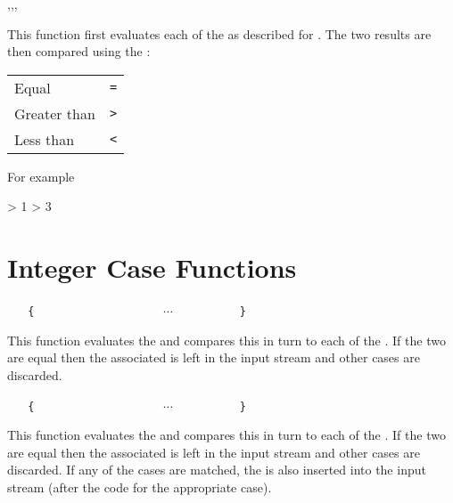 \documentclass[oneside]{book}
\begin{document}
\begin{function}{\intCompare,\intCompareT,\intCompareF,\intCompareTF}
\begin{syntax}
   
    
    
     
\end{syntax}
This function first evaluates each of the 
as described for . The two results are then
compared using the :\par
{\centering\begin{tabular}{ll}
Equal        & \texttt{=} \\
Greater than & \texttt{>} \\
Less than    & \texttt{<} \\
\end{tabular}\par}
For example
\begin{demohigh}
 > {1} {} {}
 > {3} {} {}
\end{demohigh}
\end{function}

\section{Integer Case Functions}

\begin{function}{\intCase}
\begin{syntax}
 
~ ~ \verb|{|
~ ~ ~ ~  
~ ~ ~ ~  
~ ~ ~ ~ $\cdots$
~ ~ ~ ~  
~ ~ \verb|}|
\end{syntax}
This function evaluates the  and
compares this in turn to each of the
. If the two are equal then the
associated  is left in the input stream
and other cases are discarded.
\end{function}

\begin{function}{\intCaseT}
\begin{syntax}
 
~ ~ \verb|{|
~ ~ ~ ~  
~ ~ ~ ~  
~ ~ ~ ~ $\cdots$
~ ~ ~ ~  
~ ~ \verb|}|
~ ~ 
\end{syntax}
This function evaluates the  and
compares this in turn to each of the
. If the two are equal then the
associated  is left in the input stream
and other cases are discarded. If any of the
cases are matched, the  is also inserted into the
input stream (after the code for the appropriate case).
\end{function}
\end{document}
